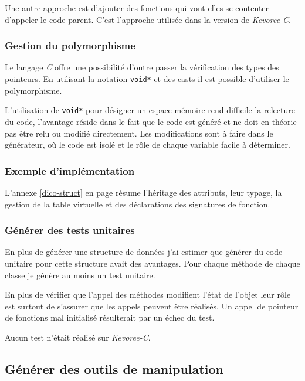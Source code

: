 Une autre approche est d'ajouter des fonctions qui vont elles se contenter d'appeler le code parent. C'est l'approche utilisée dans la version de \emph{Kevoree-C}.

\subsubsection{Gestion du polymorphisme}

Le langage \emph{C} offre une possibilité d'outre passer la vérification des types des pointeurs. En utilisant la notation \texttt{void*} et des casts il est possible d'utiliser le polymorphisme.

L'utilisation de \texttt{void*} pour désigner un espace mémoire rend difficile la relecture du code, l'avantage réside dans le fait que le code est généré et ne doit en théorie pas être relu ou modifié directement. Les modifications sont à faire dans le générateur, où le code est isolé et le rôle de chaque variable facile à déterminer.

\subsubsection{Exemple d'implémentation}

L'annexe \ref{dico-struct} en page \pageref{dico-struct} résume l'héritage des attributs, leur typage, la gestion de la table virtuelle et des déclarations des signatures de fonction.

\subsubsection{Générer des tests unitaires}

En plus de générer une structure de données j'ai estimer que générer du code unitaire pour cette structure avait des avantages. Pour chaque méthode de chaque classe je génère au moins un test unitaire.

En plus de vérifier que l'appel des méthodes modifient l'état de l'objet leur rôle est surtout de s'assurer que les appels peuvent être réalisés. Un appel de pointeur de fonctions mal initialisé résulterait par un échec du test.

Aucun test n'était réalisé sur \emph{Kevoree-C}.

\subsection{Générer des outils de manipulation}

